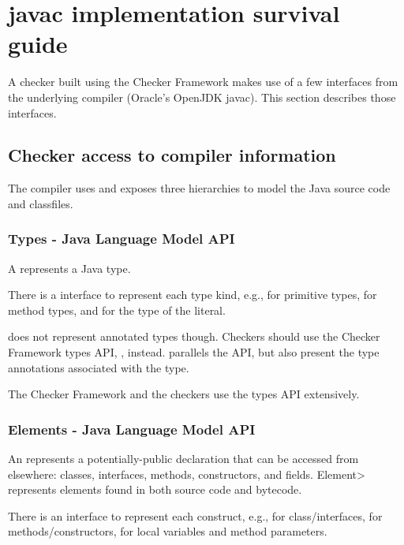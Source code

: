 \section{javac implementation survival guide\label{javac-tips}}

A checker built using the Checker Framework makes use of a few interfaces
from the underlying compiler (Oracle's OpenJDK javac).
This section describes those interfaces.




\subsection{Checker access to compiler information}

The compiler uses and exposes three hierarchies to model the Java
source code and classfiles.


\subsubsection{Types - Java Language Model API\label{javac-types}}

A  represents a Java type.

There is a  interface to represent each type kind,
e.g.,  for primitive types, 
for method types, and  for the type of the  literal.

 does not represent annotated types though.  Checkers
should use the Checker Framework types API,
, instead.  
parallels the  API, but also present the type annotations
associated with the type.

The Checker Framework and the checkers use the types API extensively.


\subsubsection{Elements - Java Language Model API\label{javac-elements}}

An  represents a potentially-public
declaration that can be accessed from elsewhere:  classes, interfaces, methods, constructors, and
fields.  \<Element> represents elements found in both source
code and bytecode.

There is an  interface to represent each construct, e.g.,
 for class/interfaces,  for
methods/constructors,  for local variables and
method parameters.


